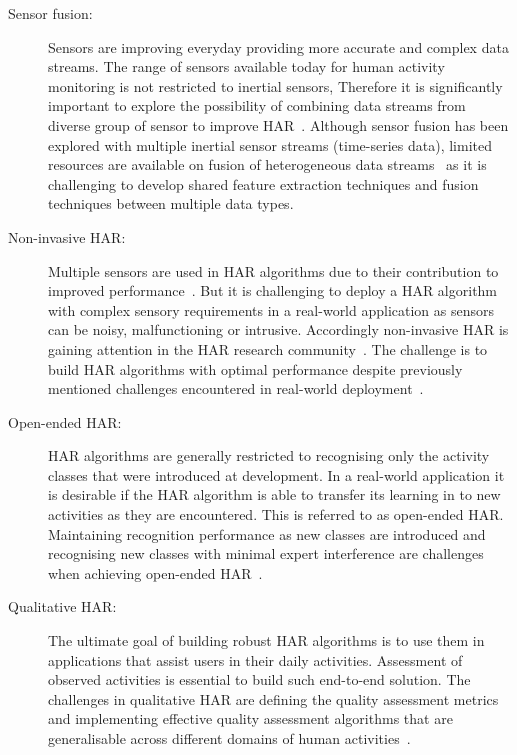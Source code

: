 \documentclass[runningheads]{llncs}
\begin{document}
\begin{description}
\item[Sensor fusion:] Sensors are improving everyday providing more accurate and complex data streams. The range of sensors available today for human activity monitoring is not restricted to inertial sensors, Therefore it is significantly important to explore the possibility of combining data streams from diverse group of sensor to improve HAR~\cite{wang2018deep,baltruvsaitis2018multimodal}. Although sensor fusion has been explored with multiple inertial sensor streams (time-series data), limited resources are available on fusion of heterogeneous data streams~\cite{ngiam2011multimodal} as it is challenging to develop shared feature extraction techniques and fusion techniques between multiple data types.

\item[Non-invasive HAR:] Multiple sensors are used in HAR algorithms due to their contribution to improved performance~\cite{radu2016towards}. But it is challenging to deploy a HAR algorithm with complex sensory requirements in a real-world application as sensors can be noisy, malfunctioning or intrusive. Accordingly non-invasive HAR is gaining attention in the HAR research community~\cite{wang2018deep}. The challenge is to build HAR algorithms with optimal performance despite previously mentioned challenges encountered in real-world deployment~\cite{wang2018deep}. 

\item[Open-ended HAR:] HAR algorithms are generally restricted to recognising only the activity classes that were introduced at development. In a real-world application it is desirable if the HAR algorithm is able to transfer its learning in to new activities as they are encountered. This is referred to as open-ended HAR. Maintaining recognition performance as new classes are introduced and recognising new classes with minimal expert interference are challenges when achieving open-ended HAR~\cite{wang2018deep,nweke2018deep}. 

\item[Qualitative HAR:] The ultimate goal of building robust HAR algorithms is to use them in applications that assist users in their daily activities. Assessment of observed activities is essential to build such end-to-end solution. The challenges in qualitative HAR are defining the quality assessment metrics and implementing effective quality assessment algorithms that are generalisable across different domains of human activities~\cite{wang2018deep}. 
\end{description}
\end{document}
